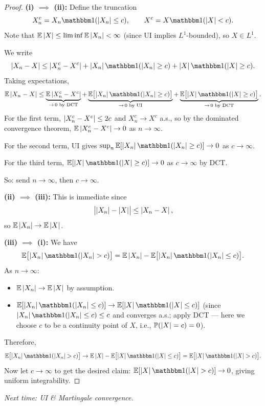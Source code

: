 \begin{proof}
    \textbf{(i) $\implies$ (ii):} Define the truncation
    \[
        X_n^c = X_n \ind(\abs{X_n} \leq c), \qquad X^c = X \ind(\abs{X} < c).
    \]
    Note that $\mathbb{E}\left|X\right| \leq \liminf \mathbb{E}\left|X_n\right| < \infty$ (since UI implies $L^1$-bounded), so $X \in L^1$.

    We write
    \[
        \abs{X_n - X}
        \leq \abs{X_n^c - X^c} + \abs{X_n} \ind(\abs{X_n} \geq c) + \abs{X} \ind(\abs{X} \geq c).
    \]
    Taking expectations,
    \[
        \E\abs{X_n - X}
        \leq \underbrace{\E\abs{X_n^c - X^c}}_{\to\, 0 \text{ by DCT}}
        + \underbrace{\E\bigl[\abs{X_n} \ind(\abs{X_n} \geq c)\bigr]}_{\to\, 0 \text{ by UI}}
        + \underbrace{\E\bigl[\abs{X} \ind(\abs{X} \geq c)\bigr]}_{\to\, 0 \text{ by DCT}}.
    \]
    For the first term, $\left|X_n^c - X^c\right| \leq 2c$ and $X_n^c \to X^c$ a.s., so by the dominated convergence theorem, $\mathbb{E}\left|X_n^c - X^c\right| \to 0$ as $n \to \infty$.

    For the second term, UI gives $\sup_n \E[\abs{X_n} \ind(\abs{X_n} \geq c)] \to 0$ as $c \to \infty$.

    For the third term, $\E[\abs{X} \ind(\abs{X} \geq c)] \to 0$ as $c \to \infty$ by DCT.

    So: send $n \to \infty$, then $c \to \infty$.

    \medskip

    \textbf{(ii) $\implies$ (iii):} This is immediate since
    \[
        \bigl|\left|X_n\right| - \left|X\right|\bigr| \leq \left|X_n - X\right|,
    \]
    so $\mathbb{E}\left|X_n\right| \to \mathbb{E}\left|X\right|$.

    \medskip

    \textbf{(iii) $\implies$ (i):} We have
    \[
        \E\bigl[\abs{X_n} \ind(\abs{X_n} > c)\bigr]
        = \E\abs{X_n} - \E\bigl[\abs{X_n} \ind(\abs{X_n} \leq c)\bigr].
    \]
    As $n \to \infty$:
    \begin{itemize}
        \item $\mathbb{E}\left|X_n\right| \to \mathbb{E}\left|X\right|$ by assumption.
        \item $\E[\abs{X_n} \ind(\abs{X_n} \leq c)] \to \E[\abs{X} \ind(\abs{X} \leq c)]$ (since $\abs{X_n} \ind(\abs{X_n} \leq c) \leq c$ and converges a.s.; apply DCT --- here we choose $c$ to be a continuity point of $X$, i.e., $\mathbb{P}(\left|X\right| = c) = 0$).
    \end{itemize}
    Therefore,
    \[
        \E\bigl[\abs{X_n} \ind(\abs{X_n} > c)\bigr] \to \E\abs{X} - \E\bigl[\abs{X} \ind(\abs{X} \leq c)\bigr] = \E\bigl[\abs{X} \ind(\abs{X} > c)\bigr].
    \]
    Now let $c \to \infty$ to get the desired claim: $\E[\abs{X} \ind(\abs{X} > c)] \to 0$, giving uniform integrability.
\end{proof}

\medskip

\textit{Next time: UI \& Martingale convergence.}

